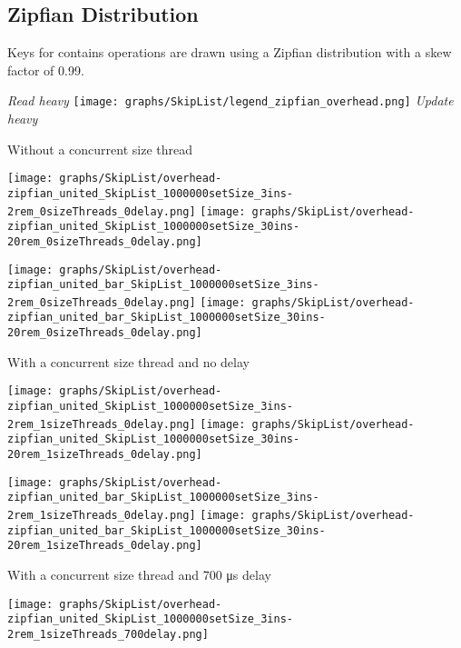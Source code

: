 \documentclass{article}
\begin{document}
\newpage
\subsection{Zipfian Distribution}
Keys for contains operations are drawn using a Zipfian distribution with a skew factor of 0.99.
\begin{figure*}[htbp]
	\centering
	\medskip
	\textit{Read heavy}\quad\quad
	\texttt{[image: graphs/SkipList/legend\_zipfian\_overhead.png]}\quad\quad
	\textit{Update heavy}\par
	\medskip
	Without a concurrent size thread\par
        \smallskip
	\texttt{[image: graphs/SkipList/overhead-zipfian\_united\_SkipList\_1000000setSize\_3ins-2rem\_0sizeThreads\_0delay.png]}\hspace{2.5em}
	\texttt{[image: graphs/SkipList/overhead-zipfian\_united\_SkipList\_1000000setSize\_30ins-20rem\_0sizeThreads\_0delay.png]}\par
	\texttt{[image: graphs/SkipList/overhead-zipfian\_united\_bar\_SkipList\_1000000setSize\_3ins-2rem\_0sizeThreads\_0delay.png]}\hspace{2.5em}
	\texttt{[image: graphs/SkipList/overhead-zipfian\_united\_bar\_SkipList\_1000000setSize\_30ins-20rem\_0sizeThreads\_0delay.png]}\par
	\medskip
	With a concurrent size thread and no delay\par
	\texttt{[image: graphs/SkipList/overhead-zipfian\_united\_SkipList\_1000000setSize\_3ins-2rem\_1sizeThreads\_0delay.png]}\hspace{2.5em}
	\texttt{[image: graphs/SkipList/overhead-zipfian\_united\_SkipList\_1000000setSize\_30ins-20rem\_1sizeThreads\_0delay.png]}\par
	\texttt{[image: graphs/SkipList/overhead-zipfian\_united\_bar\_SkipList\_1000000setSize\_3ins-2rem\_1sizeThreads\_0delay.png]}\hspace{2.5em}
	\texttt{[image: graphs/SkipList/overhead-zipfian\_united\_bar\_SkipList\_1000000setSize\_30ins-20rem\_1sizeThreads\_0delay.png]}\par
	\medskip
	With a concurrent size thread and 700 \si{\micro\second} delay\par
	\texttt{[image: graphs/SkipList/overhead-zipfian\_united\_SkipList\_1000000setSize\_3ins-2rem\_1sizeThreads\_700delay.png]}\hspace{2.5em}

\end{figure*}
\end{document}
